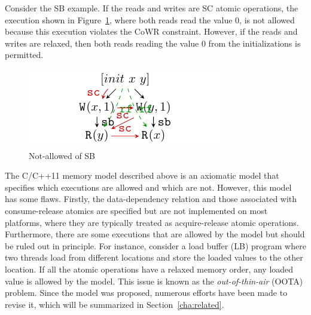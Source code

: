 Consider the SB example. If the reads and writes are SC atomic operations, the execution shown in Figure~\ref{NotAllowedSB}, where both reads read the value 0, is not allowed because this execution violates the CoWR constraint. However, if the reads and writes are relaxed, then both reads reading the value 0 from the initializations is permitted.


\begin{figure}[htbp] %
	\centering
	\includegraphics[scale=1.3]{figure/exec-graph/SB3.pdf} %
	\caption{Not-allowed of SB} %
	\label{NotAllowedSB} %
\end{figure}



The C/C++11 memory model described above is an axiomatic model that specifies which executions are allowed and which are not. However, this model has some flaws. Firstly, the data-dependency relation and those associated with consume-release atomics are specified but are not implemented on most platforms, where they are typically treated as acquire-release atomic operations. Furthermore, there are some executions that are allowed by the model but should be ruled out in principle. For instance, consider a load buffer (LB) program where two threads load from different locations and store the loaded values to the other location. If all the atomic operations have a relaxed memory order, any loaded value is allowed by the model. This issue is known as the \textit{out-of-thin-air} (OOTA) problem. Since the model was proposed, numerous efforts have been made to revise it, which will be summarized in Section~\ref{cha:related}.


